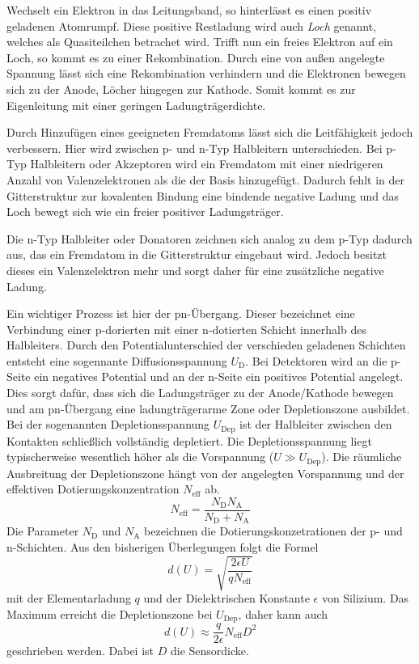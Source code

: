 Wechselt ein Elektron in das Leitungsband, so hinterlässt es einen positiv
geladenen Atomrumpf. Diese positive Restladung wird auch \textit{Loch} genannt,
welches als Quasiteilchen betrachet wird. Trifft nun ein freies Elektron auf ein
Loch, so kommt es zu einer Rekombination. Durch eine von außen angelegte Spannung
lässt sich eine Rekombination verhindern und die Elektronen bewegen sich
zu der Anode, Löcher hingegen zur Kathode. Somit kommt es zur Eigenleitung
mit einer geringen Ladungträgerdichte.

Durch Hinzufügen eines geeigneten Fremdatoms lässt sich die Leitfähigkeit jedoch verbessern.
Hier wird zwischen p- und n-Typ Halbleitern unterschieden.
Bei p-Typ Halbleitern oder Akzeptoren wird ein Fremdatom mit einer niedrigeren
Anzahl von Valenzelektronen als die der Basis
hinzugefügt. Dadurch fehlt in der Gitterstruktur zur kovalenten
Bindung eine bindende negative Ladung und das Loch bewegt sich wie ein freier
positiver Ladungsträger.

Die n-Typ Halbleiter oder Donatoren zeichnen sich analog zu dem p-Typ dadurch aus, das ein
Fremdatom in die Gitterstruktur eingebaut wird. Jedoch besitzt dieses ein
Valenzelektron mehr und sorgt daher für eine zusätzliche negative Ladung.

Ein wichtiger Prozess ist hier der pn-Übergang. Dieser bezeichnet eine Verbindung
einer p-dorierten mit einer n-dotierten Schicht innerhalb des Halbleiters. Durch den
Potentialunterschied der verschieden geladenen Schichten entsteht eine sogennante
Diffusionsspannung $U_\text{D}$. Bei Detektoren wird an die p-Seite ein negatives
Potential und an der n-Seite ein positives Potential angelegt. Dies sorgt dafür,
dass sich die Ladungsträger zu der Anode/Kathode bewegen und am pn-Übergang eine
ladungträgerarme Zone oder Depletionszone ausbildet.
Bei der sogenannten Depletionsspannung $U_\text{Dep}$ ist der Halbleiter zwischen den
Kontakten schließlich vollständig depletiert.
Die Depletionsspannung liegt typischerweise wesentlich höher als die
Vorspannung ($U \gg U_\text{Dep}$). Die räumliche Ausbreitung der Depletionszone
hängt von der angelegten Vorspannung und der effektiven Dotierungskonzentration
$N_\text{eff}$ ab.
\begin{equation}
  N_\text{eff} = \frac{N_\text{D}N_\text{A}}{N_\text{D}+N_\text{A}}
\end{equation}
Die Parameter $N_\text{D}$ und $N_\text{A}$ bezeichnen die Dotierungskonzetrationen
der p- und n-Schichten.
Aus den bisherigen Überlegungen folgt die Formel
\begin{equation}
  d(U) = \sqrt{\frac{2\epsilon U}{q N_\text{eff}}}
\end{equation}
mit der Elementarladung $q$ und der Dielektrischen Konstante $\epsilon$ von
Silizium. Das Maximum erreicht die Depletionszone bei $U_\text{Dep}$, daher kann
auch
\begin{equation}
  d(U) \approx \frac{q}{2\epsilon} N_\text{eff}D^2
\end{equation}
geschrieben werden. Dabei ist $D$ die Sensordicke.

